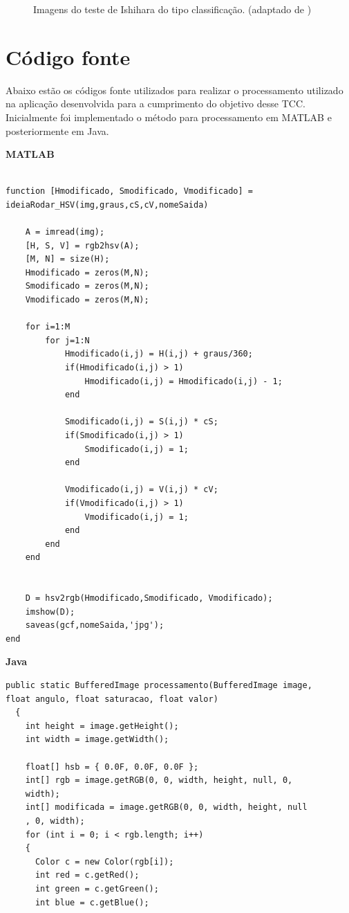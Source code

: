 \documentclass[	12pt, Times, openright, twoside, a4paper, english, brazil]{abntex2}
\begin{document}
\begin{apendicesenv}
\begin{figure}[!htb]
\caption{Imagens do teste de Ishihara do tipo classificação. (adaptado de )}
\label{fig:apendiceClassificacao}

\end{figure}

\chapter{Código fonte}
\label{ap:codigo}

Abaixo estão os códigos fonte utilizados para realizar o processamento utilizado na aplicação desenvolvida para a cumprimento do objetivo desse TCC. Inicialmente foi implementado o método para processamento em MATLAB e posteriormente em Java.

\textbf{MATLAB}
\begin{lstlisting}

function [Hmodificado, Smodificado, Vmodificado] = 
ideiaRodar_HSV(img,graus,cS,cV,nomeSaida)

    A = imread(img);
    [H, S, V] = rgb2hsv(A);  
    [M, N] = size(H);    
    Hmodificado = zeros(M,N);
    Smodificado = zeros(M,N);
    Vmodificado = zeros(M,N);

    for i=1:M
        for j=1:N
            Hmodificado(i,j) = H(i,j) + graus/360;
            if(Hmodificado(i,j) > 1)
                Hmodificado(i,j) = Hmodificado(i,j) - 1;
            end
       
            Smodificado(i,j) = S(i,j) * cS;
            if(Smodificado(i,j) > 1)
                Smodificado(i,j) = 1;
            end
    
            Vmodificado(i,j) = V(i,j) * cV;
            if(Vmodificado(i,j) > 1)
                Vmodificado(i,j) = 1;
            end
        end
    end
        
    
    D = hsv2rgb(Hmodificado,Smodificado, Vmodificado);
    imshow(D);
    saveas(gcf,nomeSaida,'jpg');
end

\end{lstlisting}

\textbf{Java}
\begin{lstlisting}
public static BufferedImage processamento(BufferedImage image, 
float angulo, float saturacao, float valor)
  {
    int height = image.getHeight();
    int width = image.getWidth();
    
    float[] hsb = { 0.0F, 0.0F, 0.0F };
    int[] rgb = image.getRGB(0, 0, width, height, null, 0,
    width);
    int[] modificada = image.getRGB(0, 0, width, height, null
    , 0, width);
    for (int i = 0; i < rgb.length; i++)
    {
      Color c = new Color(rgb[i]);
      int red = c.getRed();
      int green = c.getGreen();
      int blue = c.getBlue();
      

\end{lstlisting}
\end{apendicesenv}
\end{document}
